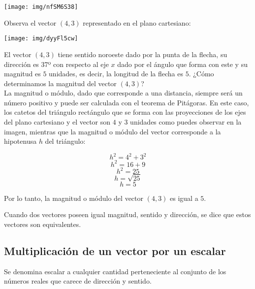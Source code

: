 \begin{center}
	\texttt{[image: img/nfSM6S38]}
\end{center}

\noindent Observa el vector $(4,3)$ representado en el plano cartesiano:

\begin{center}
	\texttt{[image: img/dyyFl5cw]}
\end{center}

\noindent El vector $(4,3)$ tiene sentido noroeste dado por la punta de la flecha, su dirección es 37º con respecto al eje $x$ dado por el ángulo que forma con este y su magnitud es $5$ unidades, es decir, la longitud de la flecha es $5$. ¿Cómo determinamos la magnitud del vector $(4,3)$?\\

\noindent La magnitud o módulo, dado que corresponde a una distancia, siempre será un número positivo y puede ser calculada con el teorema de Pitágoras. En este caso, los catetos del triángulo rectángulo que se forma con las proyecciones de los ejes del plano cartesiano y el vector son $4$ y $3$ unidades como puedes observar en la imagen, mientras que la magnitud o módulo del vector corresponde a la hipotenusa $h$ del triángulo:

$$h^2=4^2+3^2$$
$$h^2=16+9$$
$$h^2=25$$
$$h=\sqrt{25}$$
$$h=5$$

\vspace*{.1cm}

\noindent Por lo tanto, la magnitud o módulo del vector $(4,3)$ es igual a $5$. 


\noindent Cuando dos vectores poseen igual magnitud, sentido y dirección, se dice que estos vectores son equivalentes.

\subsection{Multiplicación de un vector por un escalar}

Se denomina escalar a cualquier cantidad perteneciente al conjunto de los números reales que carece de dirección y sentido.


